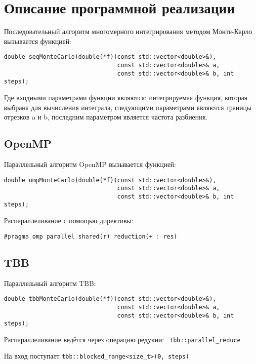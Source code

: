 \documentclass{report}
\begin{document}
\section*{Описание программной реализации}
\par Последовательный алгоритм многомерного интегрирования методом Монте-Карло вызывается функцией:
\begin{lstlisting}
double seqMonteCarlo(double(*f)(const std::vector<double>&),
                                const std::vector<double>& a,
                                const std::vector<double>& b, int steps);
\end{lstlisting}
\par Где входными параметрами функции являются: интегрируемая функция, которая выбрана для вычисления интеграла, следующими параметрами являются границы отрезков a и b, последним параметром является частота разбиения.
\subsection*{OpenMP}
\par Параллельный алгоритм OpenMP вызывается функцией:
\begin{lstlisting}
double ompMonteCarlo(double(*f)(const std::vector<double>&),
                                const std::vector<double>& a,
                                const std::vector<double>& b, int steps);
\end{lstlisting}
\par Распараллеливание с помощью директивы:
\par\verb|#pragma omp parallel shared(r) reduction(+ : res)|
\subsection*{TBB}
\par Параллельный алгоритм TBB:
\begin{lstlisting}
double tbbMonteCarlo(double(*f)(const std::vector<double>&),
                                const std::vector<double>& a,
                                const std::vector<double>& b, int steps);
\end{lstlisting}
\par Распараллеливание ведётся через операцию редукии: \verb| tbb::parallel_reduce|
\par На вход поступает \verb|tbb::blocked_range<size_t>(0, steps)|
\end{document}

